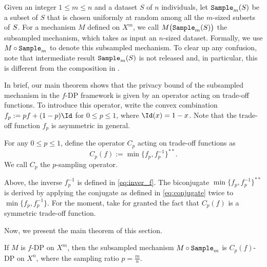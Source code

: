 Given an integer $1 \le m \le n$ and a dataset $S$ of $n$ individuals, let $\mathtt{Sample}_m(S)$ be a subset of $S$ that is chosen uniformly at random among all the $m$-sized subsets of $S$. For a mechanism $M$ defined on $X^m$, we call $M\big(\mathtt{Sample}_m(S)\big)$ the subsampled mechanism, which takes as input an $n$-sized dataset. Formally, we use $M \circ \mathtt{Sample}_m$ to denote this subsampled mechanism. To clear up any confusion, note that intermediate result $\mathtt{Sample}_m(S)$ is not released and, in particular, this is different from the composition in .



In brief, our main theorem shows that the privacy bound of the subsampled mechanism in the $f$-DP framework is given by an operator acting on trade-off functions. To introduce this operator, write the convex combination $f_p:= pf + (1-p)\Id$ for $0 \le p \le 1$, where $\Id(x) = 1-x$. Note that the trade-off function $f_p$ is asymmetric in general.
\begin{definition} \label{def:Cp}
For any $0 \le p \le 1$, define the operator $C_p$ acting on trade-off functions as
\[C_p(f) := \min\{f_p, f_p^{-1}\}^{**}.\]
We call $C_p$ the $p$-sampling operator.
\end{definition}
Above, the inverse $f_p^{-1}$ is defined in \eqref{eq:inver_f}. The biconjugate $\min\{f_p, f_p^{-1}\}^{**}$ is derived by applying the conjugate as defined in \eqref{eq:conjugate} twice to $\min\{f_p, f_p^{-1}\}$. For the moment, take for granted the fact that $C_p(f)$ is a symmetric trade-off function.


Now, we present the main theorem of this section.

\begin{theorem}\label{thm:subsample}
If $M$ is $f$-DP on $X^m$, then the subsampled mechanism $M\circ\mathtt{Sample}_m$ is $C_p(f)$-DP on $X^n$, where the sampling ratio $p=\frac{m}{n}$.
\end{theorem}


